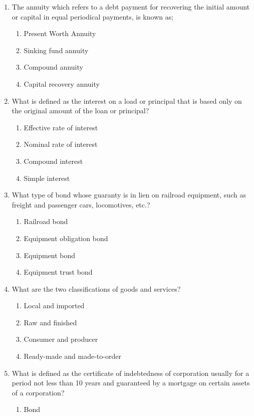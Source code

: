 \documentclass[11pt,a4paper]{article}
\begin{document}
\begin{enumerate}
\begin{enumerate*}[itemjoin=\qquad, label=\Alph*.]
\end{enumerate*}
\item{The annuity which refers to a debt payment for recovering the initial amount or capital in equal periodical payments, is known as;}
\begin{enumerate}[label=\Alph*.]
\item{Present Worth Annuity}
\item{Sinking fund annuity}
\item{Compound annuity}
\item{Capital recovery annuity}
\end{enumerate}
\item{What is defined as the interest on a load or principal that is based only on the original amount of the loan or principal?}
\begin{enumerate}[label=\Alph*.]
\item{Effective rate of interest}
\item{Nominal rate of interest}
\item{Compound interest}
\item{Simple interest}
\end{enumerate}
\item{What type of bond whose guaranty is in lien on railroad equipment, such as freight and passenger cars, locomotives, etc.?}
\begin{enumerate}[label=\Alph*.]
\item{Railroad bond}
\item{Equipment obligation bond}
\item{Equipment bond}
\item{Equipment trust bond}
\end{enumerate}
\item{What are the two classifications of goods and services?}
\begin{enumerate}[label=\Alph*.]
\item{Local and imported}
\item{Raw and finished}
\item{Consumer and producer}
\item{Ready-made and made-to-order}
\end{enumerate}
\item{What is defined as the certificate of indebtedness of corporation usually for a period not less than 10 years and guaranteed by a mortgage on certain assets of a corporation?}
\begin{enumerate}[label=\Alph*.]
\item{Bond}

\end{enumerate}
\end{enumerate}
\end{document}
